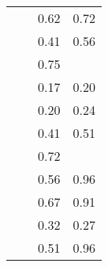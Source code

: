 \begin{table}[p]
\begin{tabularx}{\textwidth}{llCC}
        \Cohere{} & \CohereChatModel{} & \NotSigPValue{} \num{0.62} & \NotSigPValue{} \num{0.72} \\
        \Cohere{} & \CohereEmbeddingModel{} & \NotSigPValue{} \num{0.41} & \NotSigPValue{} \num{0.56} \\
        \DeepSeek{} & \DeepSeekModel{} & \NotSigPValue{} \num{0.75} & \NAMark{} \\
        \Google{} & \GoogleChatModel{} & \NotSigPValue{} \num{0.17} & \NotSigPValue{} \num{0.20} \\
        \Google{} & \GoogleEmbeddingModel{} & \NotSigPValue{} \num{0.20} & \NotSigPValue{} \num{0.24} \\
        \Groq{} & \GroqModel{} & \NotSigPValue{} \num{0.41} & \NotSigPValue{} \num{0.51} \\
        \Hyperbolic{} & \HyperbolicModel{} & \NotSigPValue{} \num{0.72} & \NAMark{} \\
        \Mistral{} & \MistralChatModel{} & \NotSigPValue{} \num{0.56} & \NotSigPValue{} \num{0.96} \\
        \Mistral{} & \MistralEmbeddingModel{} & \NotSigPValue{} \num{0.67} & \NotSigPValue{} \num{0.91} \\
        \OctoAI{} & \OctoAIModel{} & \NotSigPValue{} \num{0.32} & \NotSigPValue{} \num{0.27} \\
        \Together{} & \TogetherModel{} & \NotSigPValue{} \num{0.51} & \NotSigPValue{} \num{0.96} \\     
        \bottomrule
    \end{tabularx}
\end{table}


